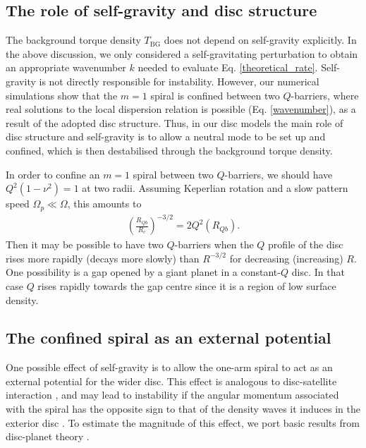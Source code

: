 
\subsection{The role of self-gravity and disc structure} 
The background torque density $T_\mathrm{BG}$ does not depend on  
self-gravity explicitly. In the above discussion, we only considered a self-gravitating perturbation to 
obtain an appropriate wavenumber $k$ needed to evaluate
Eq. \ref{theoretical_rate}. Self-gravity is not directly
responsible for instability. However, 
our numerical simulations show that the $m=1$ spiral is
confined between two $Q$-barriers, where real solutions to the local
dispersion relation is possible (Eq. \ref{wavenumber}), as a result of the adopted disc
structure. Thus, in our disc models the main role of disc structure and self-gravity is to 
allow a neutral mode to be set up and confined, which is then
destabilised through the background torque density. 

In order to confine an $m=1$ spiral between two $Q$-barriers, we
should have $Q^2(1-\nu^2)=1$ at two radii. Assuming 
Keperlian rotation and a slow pattern speed $\Omega_p\ll\Omega$, this amounts to
\begin{align}
  \left(\frac{R_{Qb}}{R_c}\right)^{-3/2} = 2Q^2(R_{Qb}). 
\end{align}
Then it may be possible to have two $Q$-barriers when the $Q$ profile
of the disc rises more rapidly (decays more slowly) than $R^{-3/2}$
for decreasing (increasing) $R$. One possibility is a gap
opened by a giant planet in a constant-$Q$ disc. In that case $Q$
rises rapidly towards the gap centre since it is a region of low
surface density.  %






\subsection{The confined spiral as an external potential}
One possible effect of self-gravity is to allow the one-arm spiral 
to act as an external potential for the wider disc. This effect is
analogous to disc-satellite interaction 
\citep{goldreich79}, and may lead to instability 
if the angular momentum associated with the spiral has the opposite 
sign to that of the density waves it induces in the exterior disc
\citep{lin11b}. To estimate the magnitude of this effect, we port basic results from
disc-planet theory \citep[see, e.g.][and references
therein]{papaloizou07}. 

